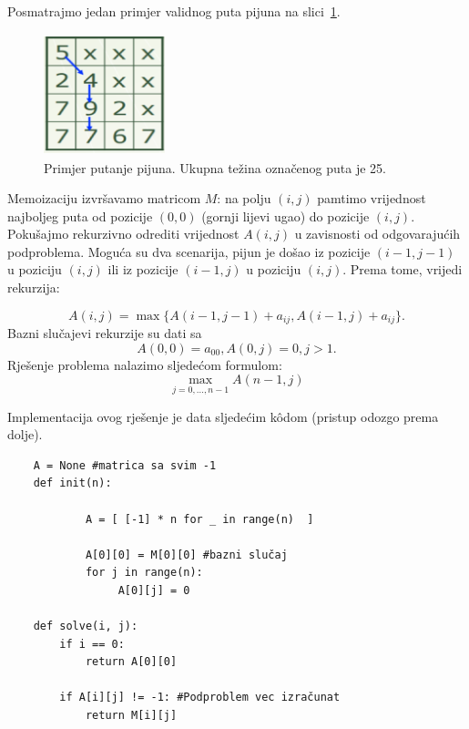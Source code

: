 \begin{solution}
	Posmatrajmo jedan primjer validnog puta pijuna na slici~\ref{fig:pijun-putanja}. 
	
	
	\begin{figure}
		\centering
		\includegraphics[width=100pt,height=100pt]{slike/dp-table-1.png}
		\caption{Primjer putanje pijuna. Ukupna težina označenog puta je 25.} \label{fig:pijun-putanja}
	\end{figure}

Memoizaciju izvršavamo matricom $M$: na polju $(i , j)$ pamtimo
vrijednost najboljeg puta od pozicije $(0, 0)$ (gornji lijevi ugao) do pozicije $(i , j)$. Pokušajmo   rekurzivno odrediti vrijednost $A(i,j)$ u zavisnosti od odgovarajućih podproblema. Moguća su dva scenarija, pijun je  došao iz pozicije $(i-1, j-1)$ u poziciju $(i,j)$ ili iz pozicije $(i-1, j)$ u poziciju $(i, j)$. Prema tome, vrijedi rekurzija: 

\begin{equation}
	A(i,j) = \max\{ A(i-1, j-1) + a_{ij}, A(i-1, j) + a_{ij}   \}.
\end{equation}
Bazni slučajevi rekurzije su dati sa 
\begin{equation}
	A(0, 0) = a_{00}, A(0, j) = 0, j > 1.
\end{equation}
Rješenje problema nalazimo sljedećom formulom:
\begin{equation}
	\max_{j=0, \ldots, n-1}A(n-1, j)
\end{equation}

Implementacija ovog rješenje je data sljedećim k\^odom (pristup odozgo prema dolje).

\begin{verbatim}
	A = None #matrica sa svim -1
	def init(n):
        
            A = [ [-1] * n for _ in range(n)  ]
		
            A[0][0] = M[0][0] #bazni slučaj
            for j in range(n):
                 A[0][j] = 0
	
	def solve(i, j):
		if i == 0:
			return A[0][0]
			
		if A[i][j] != -1: #Podproblem vec izračunat
			return M[i][j]
		

\end{verbatim}
\end{solution}
